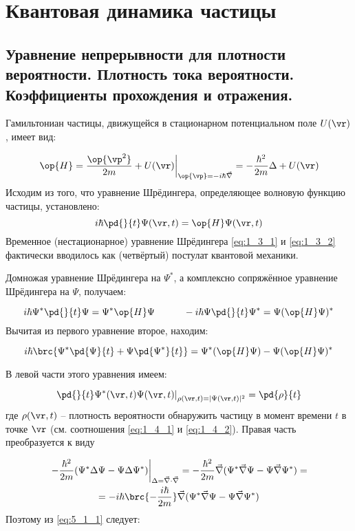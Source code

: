 \chapter{Квантовая динамика частицы}

\section{Уравнение непрерывности для плотности вероятности. Плотность тока вероятности. Коэффициенты прохождения и отражения.}

Гамильтониан частицы, движущейся в стационарном потенциальном поле $U(\vr)$, имеет вид:

$$
  \left. \op{H}=\frac{\op{\vp^2}}{2m}+U(\vr) \right|_{\op{\vp} = 
  -i\hbar\vec{\nabla}} =-\frac{\hbar^2}{2m} \Delta + U(\vr)
$$%
%
Исходим из того, что уравнение Шрёдингера, определяющее волновую функцию частицы, установлено:
$$
  i\hbar\pd{}{t} \Psi(\vr,t) = \op{H}\Psi(\vr,t)
$$%
%
Временное (нестационарное) уравнение Шрёдингера \eqref{eq:1_3_1} и \eqref{eq:1_3_2} фактически вводилось как (четвёртый) постулат квантовой механики.

Домножая уравнение Шрёдингера на $\Psi^*$, а комплексно сопряжённое уравнение Шрёдингера на $\Psi$, получаем:

$$
i\hbar\Psi^*\pd{}{t}\Psi=\Psi^*\op{H}\Psi ~~~~~~~~~ -i\hbar\Psi\pd{}{t}\Psi^*=\Psi(\op{H}\Psi)^*
$$%
%
Вычитая из первого уравнение второе, находим:

\begin{equation}
  \label{eq:5_1_1}
  i \hbar \brc{\Psi^*\pd{\Psi}{t}+\Psi\pd{\Psi^*}{t}} = 
    \Psi^*(\op{H}\Psi)-\Psi(\op{H}\Psi)^*
\end{equation}

В левой части этого уравнения имеем:

$$
  \left.
    \pd{}{t}\Psi^*(\vr,t)\Psi(\vr,t)
  \right|_{\rho(\vr,t)=|\Psi(\vr,t)|^2} = \pd{\rho}{t}
$$%
%
где $\rho(\vr,t)$ -- плотность вероятности обнаружить частицу в момент времени $t$ в точке $\vr$ (см. соотношения \eqref{eq:1_4_1} и \eqref{eq:1_4_2}). Правая часть преобразуется к виду

$$
\begin{gathered}
  \left.
    -\frac{\hbar^2}{2m}(\Psi^*\Delta\Psi-\Psi\Delta\Psi^*)
  \right|_{\Delta = \vec{\nabla}\cdot\vec{\nabla}} =
  -\frac{\hbar^2}{2m} \vec{\nabla}(\Psi^*\vec{\nabla}\Psi-\Psi\vec{\nabla}\Psi^*) = \\ =
  -i\hbar \brc{-\frac{i\hbar}{2m}}\vec{\nabla}(\Psi^*\vec{\nabla}\Psi-\Psi\vec{\nabla}\Psi^*)
\end{gathered}
$$%
%
Поэтому из \eqref{eq:5_1_1} следует:

